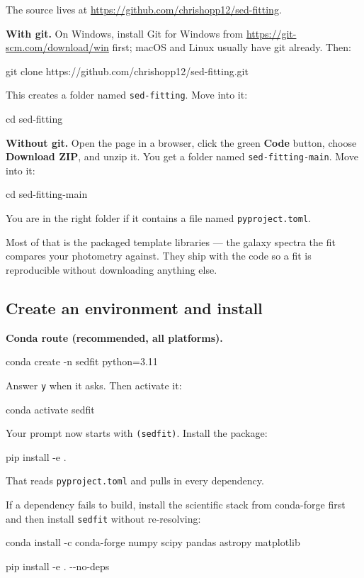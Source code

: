 \documentclass[11pt]{article}
\newcommand{\cmdline}[1]{\begin{cmd}\ttfamily #1\end{cmd}}
\begin{document}
The source lives at \url{https://github.com/chrishopp12/sed-fitting}.

\textbf{With git.} On Windows, install Git for Windows from
\url{https://git-scm.com/download/win} first; macOS and Linux usually
have git already. Then:

\cmdline{git clone https://github.com/chrishopp12/sed-fitting.git}

This creates a folder named \texttt{sed-fitting}. Move into it:

\cmdline{cd sed-fitting}

\textbf{Without git.} Open the page in a browser, click the green
\textbf{Code} button, choose \textbf{Download ZIP}, and unzip it. You get
a folder named \texttt{sed-fitting-main}. Move into it:

\cmdline{cd sed-fitting-main}

You are in the right folder if it contains a file named
\texttt{pyproject.toml}.

\begin{notebox}
Most of that is the packaged template libraries --- the galaxy spectra
the fit compares your photometry against. They ship with the code so a
fit is reproducible without downloading anything else.
\end{notebox}

\subsection{Create an environment and install}

\textbf{Conda route (recommended, all platforms).}

\cmdline{conda create -n sedfit python=3.11}

Answer \texttt{y} when it asks. Then activate it:

\cmdline{conda activate sedfit}

Your prompt now starts with \texttt{(sedfit)}. Install the package:

\cmdline{pip install -e .}

That reads \texttt{pyproject.toml} and pulls in every dependency.

If a dependency fails to build, install the scientific stack from
conda-forge first and then install \texttt{sedfit} without re-resolving:

\cmdline{conda install -c conda-forge numpy scipy pandas astropy matplotlib}

\cmdline{pip install -e . -{}-no-deps}
\end{document}
